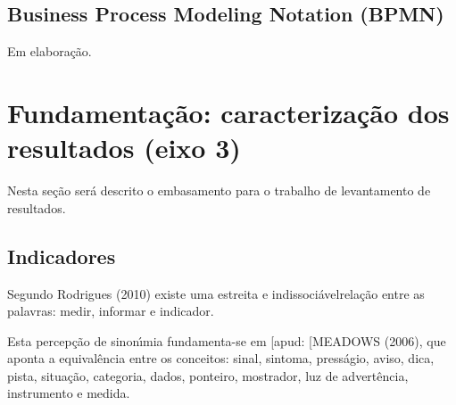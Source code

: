 \documentclass[
12pt,		%
openright,	%
twoside,  %
a4paper,			%
chapter=TITLE,		%
english,			%
french,				%
spanish,			%
brazil				%
]{USPSC-classe/USPSC}
\begin{document}
\subsection[Business Process Modeling Notation (BPMN)]{Business Process Modeling Notation (BPMN)}\label{Business Process Modeling Notation (BPMN)}
Em elabora\c{c}\~ao.














\section[Fundamenta\c{c}\~ao: caracteriza\c{c}\~ao dos resultados (eixo 3)]{Fundamenta\c{c}\~ao: caracteriza\c{c}\~ao dos resultados (eixo 3)}\label{Fundamenta\c{c}\~ao: caracteriza\c{c}\~ao dos resultados (eixo 3)}
Nesta se\c{c}\~ao ser\'a descrito o embasamento para o trabalho de levantamento de resultados.














\subsection[Indicadores]{Indicadores}\label{Indicadores}
Segundo  Rodrigues (2010)  existe uma \textquotedbl estreita e indissoci\'avel\textquotedbl  rela\c{c}\~ao entre as palavras: medir, informar e indicador.














Esta percep\c{c}\~ao de sinon\'{\i}mia fundamenta-se em [apud: [MEADOWS (2006), que aponta a equival\^encia entre os conceitos: sinal, sintoma, press\'agio, aviso, dica, pista, situa\c{c}\~ao, categoria, dados, ponteiro, mostrador, luz de advert\^encia, instrumento e medida.
\end{document}
